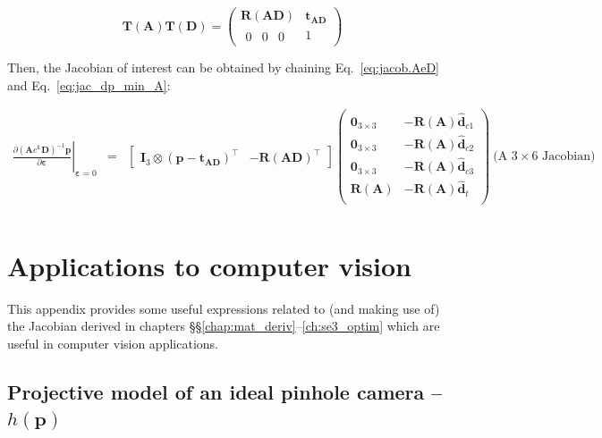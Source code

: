 \documentclass[a4paper,11pt]{report}
\newcommand{\E}{{\bm{\varepsilon}}}
\newcommand{\A}{{\mathbf{A}}}
\newcommand{\D}{{\mathbf{D}}}
\newcommand{\I}{{\mathbf{I}}}
\begin{document}
\begin{equation}
\mathbf{T}(\A) \mathbf{T}(\D)
=
\left(
\begin{array}{c|c}
 \mathbf{R}(\A\D) & \mathbf{t_{AD}} \\
\hline
 \begin{array}{ccc} 0 & 0 & 0 \end{array} & 1
\end{array}
\right)
\end{equation}

Then, the Jacobian of interest can be obtained by chaining Eq.~\ref{eq:jacob.AeD} and Eq.~\ref{eq:jac_dp_min_A}:

\begin{eqnarray}
\left. \frac{\partial (\A e^\E \D)^{-1} \mathbf{p}}{\partial \E} \right|_{\E = 0}
&=&
\left[
\begin{array}{cc}
 \I_3 \otimes (\mathbf{p}-\mathbf{t_{AD}})^\top  & -\mathbf{R}(\A\D)^\top
\end{array}
\right]
\left(
\begin{array}{cc}
 \mathbf{0}_{3\times 3}  & -\mathbf{R}(\A) \hat{\mathbf{d}}_{c1} \\
 \mathbf{0}_{3\times 3}  & -\mathbf{R}(\A) \hat{\mathbf{d}}_{c2} \\
 \mathbf{0}_{3\times 3}  & -\mathbf{R}(\A) \hat{\mathbf{d}}_{c3} \\
 \mathbf{R}(\A)        & -\mathbf{R}(\A) \hat{\mathbf{d}}_{t} \\
\end{array}
\right)
~ \text{(A $3 \times 6$ Jacobian)} \nonumber
\\
~ %
\end{eqnarray}



\appendix

\chapter{Applications to computer vision}
\label{ch:apx:cv}

This appendix provides some useful expressions related to (and making use of)
the Jacobian derived in chapters \S\S\ref{chap:mat_deriv}--\ref{ch:se3_optim}
which are useful
in computer vision applications.


\section{Projective model of an ideal pinhole camera -- $h(\mathbf{p})$}
\end{document}
